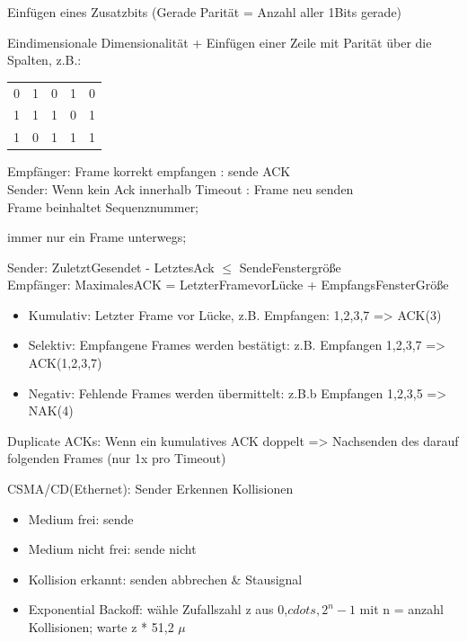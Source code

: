 Einfügen eines Zusatzbits (Gerade Parität = Anzahl aller 1Bits gerade)


Eindimensionale Dimensionalität + Einfügen einer Zeile mit Parität über die Spalten, z.B.:
\begin{tabular}{|cccc|c|}
\hline
0 & 1 & 0 & 1 & 0 \\
1 & 1 & 1 & 0 & 1 \\
\hline 
1 & 0 & 1 & 1 & 1 \\
\hline
\end{tabular}


Empfänger: Frame korrekt empfangen : sende ACK \\
Sender: Wenn kein Ack innerhalb Timeout : Frame neu senden \\
Frame beinhaltet Sequenznummer;

immer nur ein Frame unterwegs;

Sender: ZuletztGesendet - LetztesAck $\leq$ SendeFenstergröße\\
Empfänger: MaximalesACK = LetzterFramevorLücke + EmpfangsFensterGröße

\begin{itemize}
\item Kumulativ: Letzter Frame vor Lücke, z.B. Empfangen: 1,2,3,7 => ACK(3)
\item Selektiv: Empfangene Frames werden bestätigt: z.B. Empfangen 1,2,3,7 => ACK(1,2,3,7)
\item Negativ: Fehlende Frames werden übermittelt: z.B.b Empfangen 1,2,3,5 => NAK(4)
\end{itemize}
Duplicate ACKs: Wenn ein kumulatives ACK doppelt => Nachsenden des darauf folgenden Frames (nur 1x pro Timeout)



CSMA/CD(Ethernet): Sender Erkennen Kollisionen
\begin{itemize}
\item Medium frei: sende
\item Medium nicht frei: sende nicht
\item Kollision erkannt: senden abbrechen \& Stausignal
\item Exponential Backoff: wähle Zufallszahl z aus {0,$cdots, 2^n-1$} mit n = anzahl Kollisionen; warte z * 51,2 $\mu$
\end{itemize}


